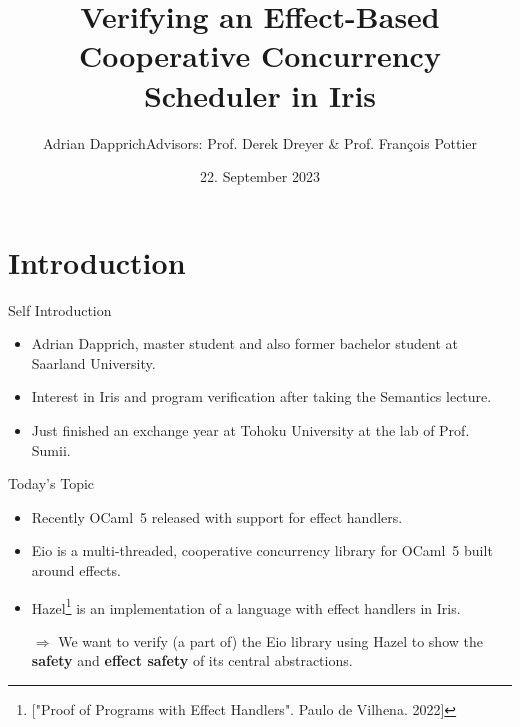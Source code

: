 \documentclass[aspectratio=43]{beamer}
\title{Verifying an Effect-Based Cooperative Concurrency Scheduler in Iris}
\author{Adrian Dapprich\newline Advisors: Prof. Derek Dreyer \& Prof. François Pottier}
\institute{Dreyer Laboratory, MPI-SWS, Saarland University}
\date{22. September 2023}
\newcommand{\ocf}{OCaml~5}
\begin{document}
\frame{\titlepage}

\section{Introduction}

\begin{frame}{Self Introduction}
    \begin{itemize}
        \item Adrian Dapprich, master student and also former bachelor student at Saarland University.
        \item Interest in Iris and program verification after taking the Semantics lecture.
        \item Just finished an exchange year at Tohoku University at the lab of Prof. Sumii.
    \end{itemize}
\end{frame}

\begin{frame}{Today's Topic}
    \begin{itemize}
        \item Recently \ocf{} released with support for effect handlers.
        \item Eio is a multi-threaded, cooperative concurrency library for \ocf{} built around effects.
        \item Hazel\footnote{["Proof of Programs with Effect Handlers". Paulo de Vilhena. 2022]} is an implementation of a language with effect handlers in Iris.
        \item[\(\Rightarrow\)] We want to verify (a part of) the Eio library using Hazel to show the \textbf{safety} and \textbf{effect safety} of its central abstractions.
    \end{itemize}
\end{frame}
\end{document}
